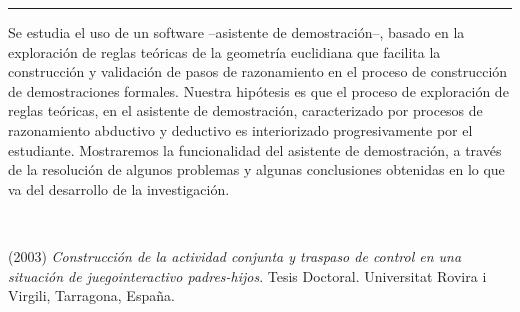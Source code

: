 \begin{titlepage}
\begin{minipage}{0.5\linewidth}
\begin{minipage}{0.45\linewidth}
    \begin{flushright}
        \printauthor
    \end{flushright}
\end{minipage} \hspace{-3pt}
%
\begin{minipage}{0.02\linewidth}
   \color{ptctitle} \rule{1pt}{245pt}
\end{minipage} 
\end{minipage}
\hspace*{-4.5cm}
\begin{minipage}{0.85\linewidth}
\begin{minipage}{0.85\linewidth}
\footnotesize
\vspace{5pt}
    \begin{resumen}
    Se estudia el uso de un software --asistente de demostraci\'on--, basado en la exploraci\'on de reglas te\'oricas de la geometr\'ia euclidiana que facilita la construcci\'on y validaci\'on de pasos de razonamiento en el proceso de construcci\'on de demostraciones formales. Nuestra hip\'otesis es que el proceso de exploraci\'on de reglas te\'oricas, en el asistente de demostraci\'on, caracterizado por procesos de razonamiento abductivo y deductivo es interiorizado progresivamente por el estudiante. Mostraremos la funcionalidad del asistente de demostraci\'on, a trav\'es de la resoluci\'on de algunos problemas y algunas conclusiones obtenidas en lo que va del desarrollo de la investigaci\'on.
    \end{resumen}
\end{minipage}
\vspace*{5pt}\\
\footnotesize
%  
    
\end{minipage}
\vspace{5pt}
\begin{thebibliography}{99}
 (2003) {\it Construcci\'on de la actividad conjunta y traspaso de control en una situaci\'on de juegointeractivo padres-hijos}.  Tesis Doctoral. Universitat Rovira i Virgili, Tarragona, Espa\~na.


\end{thebibliography}
\end{titlepage}
